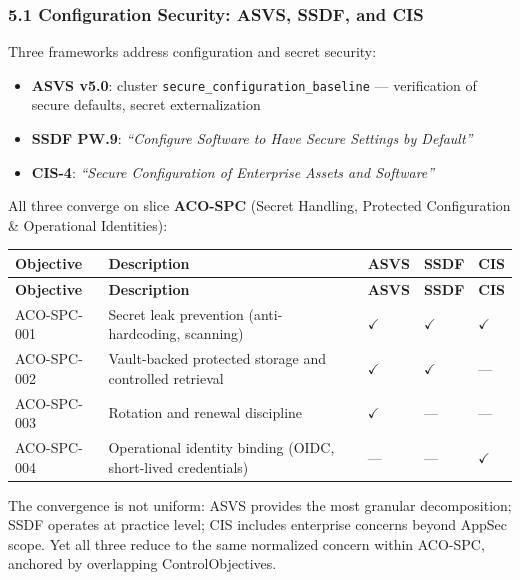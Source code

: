 \documentclass[
]{article}
\providecommand{\tightlist}{%
  \setlength{\itemsep}{0pt}\setlength{\parskip}{0pt}}
\begin{document}
\subsubsection{5.1 Configuration Security: ASVS, SSDF, and
CIS}\label{configuration-security-asvs-ssdf-and-cis}

Three frameworks address configuration and secret security:

\begin{itemize}
\tightlist
\item
  \textbf{ASVS v5.0}: cluster \texttt{secure\_configuration\_baseline}
  --- verification of secure defaults, secret externalization
\item
  \textbf{SSDF PW.9}: \emph{``Configure Software to Have Secure Settings
  by Default''}
\item
  \textbf{CIS-4}: \emph{``Secure Configuration of Enterprise Assets and
  Software''}
\end{itemize}

All three converge on slice \textbf{ACO-SPC} (Secret Handling, Protected
Configuration \& Operational Identities):

\begin{longtable}{@{}L{2.25cm}L{7.2cm}C{1cm}C{1cm}C{1cm}@{}}
\toprule
\textbf{Objective} & \textbf{Description} & \textbf{ASVS} & \textbf{SSDF} & \textbf{CIS} \\
\midrule
\endfirsthead
\toprule
\textbf{Objective} & \textbf{Description} & \textbf{ASVS} & \textbf{SSDF} & \textbf{CIS} \\
\midrule
\endhead
\bottomrule
\endfoot
\bottomrule
\endlastfoot
ACO-SPC-001 & Secret leak prevention (anti-hardcoding, scanning) & $\checkmark$ & $\checkmark$ & $\checkmark$ \\
ACO-SPC-002 & Vault-backed protected storage and controlled retrieval & $\checkmark$ & $\checkmark$ & --- \\
ACO-SPC-003 & Rotation and renewal discipline & $\checkmark$ & --- & --- \\
ACO-SPC-004 & Operational identity binding (OIDC, short-lived credentials) & --- & --- & $\checkmark$ \\
\end{longtable}

The convergence is not uniform: ASVS provides the most granular
decomposition; SSDF operates at practice level; CIS includes enterprise
concerns beyond AppSec scope. Yet all three reduce to the same
normalized concern within ACO-SPC, anchored by overlapping
ControlObjectives.
\end{document}
